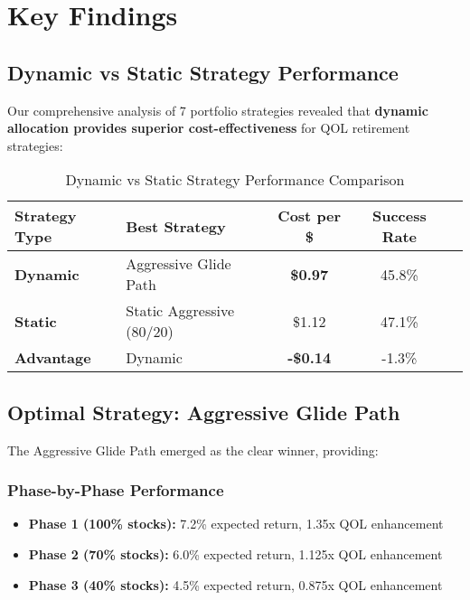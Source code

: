 \documentclass[11pt,letterpaper]{article}
\begin{document}
\section{Key Findings}

\subsection{Dynamic vs Static Strategy Performance}

Our comprehensive analysis of 7 portfolio strategies revealed that \textbf{dynamic allocation provides superior cost-effectiveness} for QOL retirement strategies:

\begin{table}[H]
\centering
\begin{tabular}{@{}llccc@{}}
\toprule
\textbf{Strategy Type} & \textbf{Best Strategy} & \textbf{Cost per \$} & \textbf{Success Rate} \\
\midrule
\textbf{Dynamic} & Aggressive Glide Path & \textbf{\$0.97} & 45.8\% \\
\textbf{Static} & Static Aggressive (80/20) & \$1.12 & 47.1\% \\
\textbf{Advantage} & Dynamic & \textbf{-\$0.14} & -1.3\% \\
\bottomrule
\end{tabular}
\caption{Dynamic vs Static Strategy Performance Comparison}
\label{tab:dynamic-static}
\end{table}

\subsection{Optimal Strategy: Aggressive Glide Path}

The Aggressive Glide Path emerged as the clear winner, providing:

\subsubsection{Phase-by-Phase Performance}
\begin{itemize}[leftmargin=*]
    \item \textbf{Phase 1 (100\% stocks):} 7.2\% expected return, 1.35x QOL enhancement
    \item \textbf{Phase 2 (70\% stocks):} 6.0\% expected return, 1.125x QOL enhancement  
    \item \textbf{Phase 3 (40\% stocks):} 4.5\% expected return, 0.875x QOL enhancement
\end{itemize}
\end{document}
